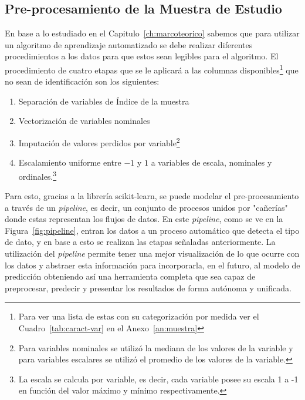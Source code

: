 \subsection{Pre-procesamiento de la Muestra de Estudio}
En base a lo estudiado en el Capitulo~\ref{ch:marcoteorico} sabemos que para utilizar un algoritmo de aprendizaje automatizado se debe realizar diferentes procedimientos a los datos para que estos sean legibles para el algoritmo. El procedimiento de cuatro etapas que se le aplicará a las columnas disponibles\footnote{Para ver una lista de estas con su categorización por medida ver el Cuadro~\ref{tab:caract-var} en el Anexo~\ref{an:muestra}} que no sean de identificación son los siguientes:
\begin{enumerate}[label=\Roman*]
\item Separación de variables de Índice de la muestra
\item Vectorización de variables nominales
\item Imputación de valores perdidos por variable\footnote{Para variables nominales se utilizó la mediana de los valores de la variable y para variables escalares se utilizó el promedio de los valores de la variable. }
\item Escalamiento uniforme entre $-1$ y $1$ a variables de escala, nominales y ordinales.\footnote{La escala se calcula por variable, es decir, cada variable posee su escala 1 a -1 en función del valor máximo y mínimo respectivamente.}
\end{enumerate}

Para esto, gracias a la librería scikit-learn, se puede modelar el pre-procesamiento a través de un \textit{pipeline}, es decir, un conjunto de procesos unidos por "cañerías" donde estas representan los flujos de datos. En este \textit{pipeline}, como se ve en la Figura~\ref{fig:pipeline}, entran los datos a un proceso automático que detecta el tipo de dato, y en base a esto se realizan las etapas señaladas anteriormente. La utilización del \textit{pipeline} permite tener una mejor visualización de lo que ocurre con los datos y abstraer esta información para incorporarla, en el futuro, al modelo de predicción obteniendo así una herramienta completa que sea capaz de preprocesar, predecir y presentar los resultados de forma autónoma y unificada.

